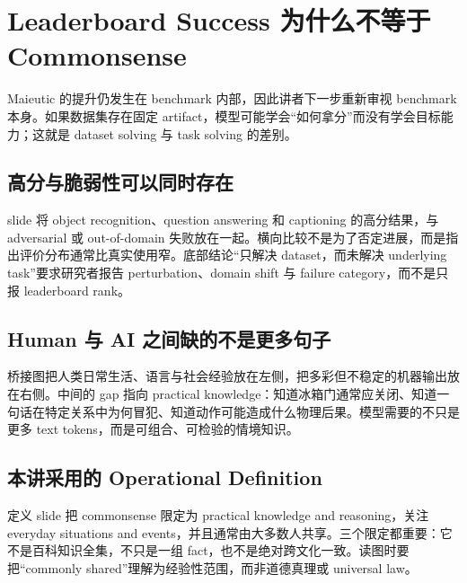 \section{Leaderboard Success 为什么不等于 Commonsense}

Maieutic 的提升仍发生在 benchmark 内部，因此讲者下一步重新审视 benchmark 本身。如果数据集存在固定 artifact，模型可能学会“如何拿分”而没有学会目标能力；这就是 dataset solving 与 task solving 的差别。

\subsection{高分与脆弱性可以同时存在}

slide 将 object recognition、question answering 和 captioning 的高分结果，与 adversarial 或 out-of-domain 失败放在一起。横向比较不是为了否定进展，而是指出评价分布通常比真实使用窄。底部结论“只解决 dataset，而未解决 underlying task”要求研究者报告 perturbation、domain shift 与 failure category，而不是只报 leaderboard rank。



\subsection{Human 与 AI 之间缺的不是更多句子}

桥接图把人类日常生活、语言与社会经验放在左侧，把多彩但不稳定的机器输出放在右侧。中间的 gap 指向 practical knowledge：知道冰箱门通常应关闭、知道一句话在特定关系中为何冒犯、知道动作可能造成什么物理后果。模型需要的不只是更多 text tokens，而是可组合、可检验的情境知识。


\subsection{本讲采用的 Operational Definition}

定义 slide 把 commonsense 限定为 practical knowledge and reasoning，关注 everyday situations and events，并且通常由大多数人共享。三个限定都重要：它不是百科知识全集，不只是一组 fact，也不是绝对跨文化一致。读图时要把“commonly shared”理解为经验性范围，而非道德真理或 universal law。

